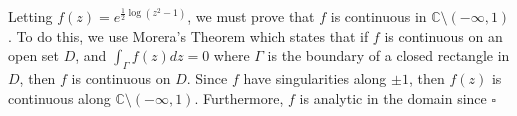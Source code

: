 \documentclass[11pt]{article}
\newcommand{\C}{\mathbb{C}}
\newenvironment{proof}{\noindent{\bf Proof.}}{\hfill $\square$\medskip}
\begin{document}
\begin{proof}
Letting $f(z)=e^{\frac{1}{2}\log(z^{2}-1)}$, we must prove that $f$ is continuous in $\C\setminus(-\infty, 1)$.
To do this, we use Morera's Theorem which states that if $f$ is continuous on an open set $D$,
and $\int_{\Gamma}f(z)dz=0$ where $\Gamma$ is the boundary of a closed rectangle in $D$, then
$f$ is continuous on $D$. Since $f$ have singularities along $\pm 1$, then $f(z)$ is continuous 
along $\C\setminus(-\infty, 1)$. Furthermore, $f$ is analytic in the domain since
\end{proof}
\end{document}
